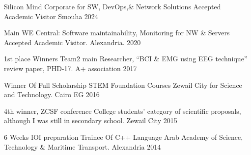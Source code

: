 


\begin{cvhonors}

  \cvhonor
    {Silicon Mind Corporate for SW, DevOps,\& Network Solutions} %
    {Accepted Academic Visitor} %
    {Smouha} %
    {2024} %

  \cvhonor
    {Main WE Central: Software maintainability, Monitoring for NW \& Servers} %
    {Accepted Academic Visitor.} %
    { Alexandria.} %
    {2020} %


  \cvhonor
    { 1st place Winners} %
    {Team2 main Researcher, “BCI \& EMG using EEG technique” review paper, PHD-17.} %
    {A+ association} %
    {2017} %


  \cvhonor
  {Winner Of Full Scholarship STEM Foundation Courses } %
  {Zewail City for Science and Technology.} %
  {Cairo EG} %
  {2016} %

  \cvhonor
  {4th winner, ZCSF conference } %
  {\scriptsize College students’ category of scientific proposals, although I was still in secondary school.} %
  {Zewail City} %
  {2015} %


    \cvhonor
      {6 Weeks IOI preparation Trainee Of C++ Language} %
      {Arab Academy of Science, Technology \& Maritime Transport.} %
      {Alexandria} %
      {2014} %
\end{cvhonors}